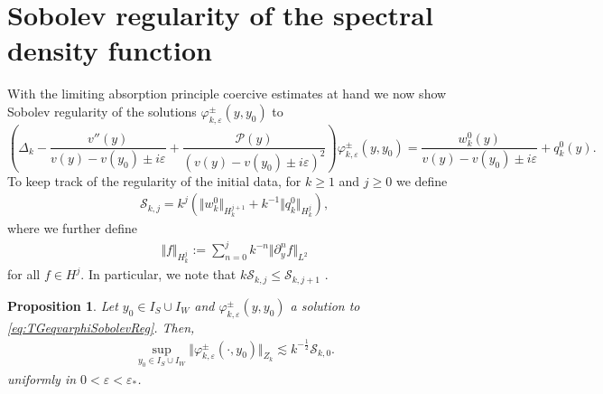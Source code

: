 \documentclass[11pt,reqno]{amsproc}
\newtheorem{proposition}{Proposition}[section]
\theoremstyle{definition}
\numberwithin{equation}{section}
\newcommand{\D}{{\Delta}}
\newcommand{\cS}{{\mathcal S}}
\newcommand{\ep}{\varepsilon}
\renewcommand{\P}{{\mathcal{P}}}
\renewcommand{\l}{\left}
\renewcommand{\r}{\right}
\begin{document}
\section{Sobolev regularity of the spectral density function}\label{sec:SobolevReg}
With the limiting absorption principle coercive estimates at hand we now show Sobolev regularity of the solutions ${\varphi}_{k,\ep}^\pm(y,y_0)$ to
\begin{equation}\label{eq:TGeqvarphiSobolevReg}
\l(\D_k-\frac{v''(y)}{v(y)-v(y_0)\pm i\ep}+\frac{\P(y)}{(v(y)-v(y_0)\pm i\ep)^2}\r){\varphi}_{k,\ep}^\pm(y,y_0)=\frac{w_k^0(y)}{v(y)-v(y_0)\pm i\ep} + q_k^0(y).
\end{equation}
To keep track of the regularity of the initial data, for $k\geq 1$ and $j\geq 0$ we define
\begin{align}\label{eq:defSnorm}
\cS_{k,j} = k^j \left( \Vert w_k^0 \Vert_{H_k^{j+1}} + k^{-1} \Vert  q_k^0 \Vert_{H_k^j} \right),
\end{align}
where we further define
\begin{align*}
\Vert f \Vert_{H_k^j} := \sum_{n=0}^j k^{-n} \Vert \partial_y^n f \Vert_{L^2}
\end{align*}
for all $f\in H^j$. In particular, we note that $k\cS_{k,j}\leq \cS_{k,j+1}$ .


\begin{proposition}\label{prop:Zkvarphi}
Let $y_0\in I_S\cup I_W$ and ${\varphi}_{k,\ep}^\pm(y,y_0)$ a solution to \eqref{eq:TGeqvarphiSobolevReg}. Then,
\begin{align*}
\sup_{y_0\in I_S\cup I_W}\Vert {\varphi}_{k,\ep}^\pm(\cdot,y_0) \Vert_{Z_k}\lesssim k^{-\frac12}\cS_{k,0}.
\end{align*}
uniformly in $0< \ep< \ep_*$. 
\end{proposition}
\end{document}
